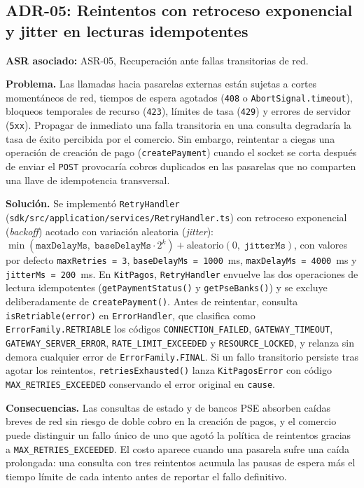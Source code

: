 \subsection{ADR-05: Reintentos con retroceso exponencial y jitter en lecturas idempotentes}
\textbf{ASR asociado:} ASR-05, Recuperación ante fallas transitorias de red.

\textbf{Problema.} Las llamadas hacia pasarelas externas están sujetas a cortes momentáneos de red, tiempos de espera agotados (\texttt{408} o \texttt{AbortSignal.timeout}), bloqueos temporales de recurso (\texttt{423}), límites de tasa (\texttt{429}) y errores de servidor (\texttt{5xx}). Propagar de inmediato una falla transitoria en una consulta degradaría la tasa de éxito percibida por el comercio. Sin embargo, reintentar a ciegas una operación de creación de pago (\texttt{createPayment}) cuando el socket se corta después de enviar el \texttt{POST} provocaría cobros duplicados en las pasarelas que no comparten una llave de idempotencia transversal.

\textbf{Solución.} Se implementó \texttt{RetryHandler} (\texttt{sdk/\allowbreak{}src/\allowbreak{}application/\allowbreak{}services/\allowbreak{}RetryHandler.ts}) con retroceso exponencial (\textit{backoff}) acotado con variación aleatoria (\textit{jitter}): $\min(\texttt{maxDelayMs},\; \texttt{baseDelayMs} \cdot 2^k) + \mathrm{aleatorio}(0,\; \texttt{jitterMs})$, con valores por defecto \texttt{maxRetries = 3}, \texttt{baseDelayMs = 1000}~ms, \texttt{maxDelayMs = 4000}~ms y \texttt{jitterMs = 200}~ms. En \texttt{KitPagos}, \texttt{RetryHandler} envuelve las dos operaciones de lectura idempotentes (\texttt{getPaymentStatus()} y \texttt{getPseBanks()}) y se excluye deliberadamente de \texttt{createPayment()}. Antes de reintentar, consulta \texttt{isRetriable(\allowbreak{}error)} en \texttt{ErrorHandler}, que clasifica como \texttt{ErrorFamily.RETRIABLE} los códigos \texttt{CONNECTION\_\allowbreak{}FAILED}, \texttt{GATEWAY\_\allowbreak{}TIMEOUT}, \texttt{GATEWAY\_\allowbreak{}SERVER\_\allowbreak{}ERROR}, \texttt{RATE\_\allowbreak{}LIMIT\_\allowbreak{}EXCEEDED} y \texttt{RESOURCE\_\allowbreak{}LOCKED}, y relanza sin demora cualquier error de \texttt{ErrorFamily.FINAL}. Si un fallo transitorio persiste tras agotar los reintentos, \texttt{retriesExhausted()} lanza \texttt{KitPagosError} con código \texttt{MAX\_\allowbreak{}RETRIES\_\allowbreak{}EXCEEDED} conservando el error original en \texttt{cause}.

\textbf{Consecuencias.} Las consultas de estado y de bancos PSE absorben caídas breves de red sin riesgo de doble cobro en la creación de pagos, y el comercio puede distinguir un fallo único de uno que agotó la política de reintentos gracias a \texttt{MAX\_RETRIES\_EXCEEDED}. El costo aparece cuando una pasarela sufre una caída prolongada: una consulta con tres reintentos acumula las pausas de espera más el tiempo límite de cada intento antes de reportar el fallo definitivo.

